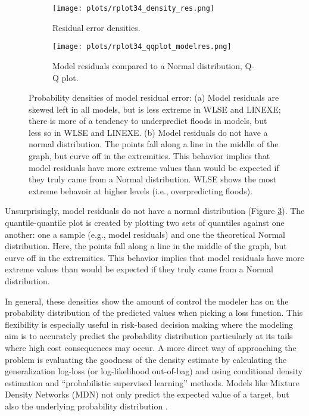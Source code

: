 \begin{figure}[ht]
	\centering
	\begin{subfigure}{\textwidth}
  		\centering
 		\texttt{[image: plots/rplot34\_density\_res.png]}
  		\caption{Residual error densities.}
  		\label{fig:density_obs}
	\end{subfigure}%
	\hfill
	\begin{subfigure}{.5\textwidth}
  		\centering
  		\texttt{[image: plots/rplot34\_qqplot\_modelres.png]}
  		\caption{Model residuals compared to a Normal distribution, Q-Q plot.}
  		\label{fig:density_res}
	\end{subfigure}
	\caption[Probability densities of model residual error.]{Probability densities of model residual error: (a) Model residuals are skewed left in all models, but is less extreme in WLSE and LINEXE; there is more of a tendency to underpredict floods in models, but less so in WLSE and LINEXE. (b) Model residuals do not have a normal distribution. The points fall along a line in the middle of the graph, but curve off in the extremities. This behavior implies that model residuals have more extreme values than would be expected if they truly came from a Normal distribution. WLSE shows the most extreme behavoir at higher levels (i.e., overpredicting floods).}
	\label{fig:reserrordens}
\end{figure}

Unsurprisingly, model residuals do not have a normal distribution (Figure \ref{fig:reserrordens}). The quantile-quantile plot is created by plotting two sets of quantiles against one another: one a sample (e.g., model residuals) and one the theoretical Normal distribution. Here, the points fall along a line in the middle of the graph, but curve off in the extremities. This behavior implies that model residuals have more extreme values than would be expected if they truly came from a Normal distribution.

In general, these densities show the amount of control the modeler has on the probability distribution of the predicted values when picking a loss function. This flexibility is especially useful in risk-based decision making where the modeling aim is to accurately predict the probability distribution particularly at its tails where high cost consequences may occur. A more direct way of approaching the problem is evaluating the goodness of the density estimate by calculating the generalization log-loss (or log-likelihood out-of-bag) and using conditional density estimation and ``probabilistic supervised learning'' methods. Models like Mixture Density Networks (MDN) not only predict the expected value of a target, but also the underlying probability distribution \cite{gressmann2018probabilistic, bishop1994mixture}.
